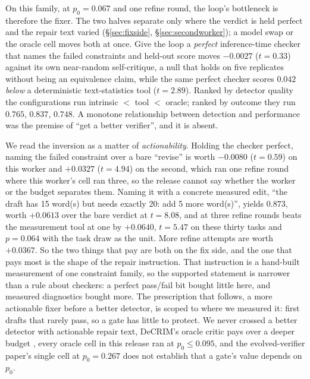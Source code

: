 \documentclass[11pt]{article}
\begin{document}
On this family, at $p_0 = 0.067$ and one refine round, the loop's bottleneck is therefore the
fixer. The two
halves separate only where the verdict is held perfect and the repair text varied
(\S\ref{sec:fixside}, \S\ref{sec:secondworker}); a model swap or the oracle cell moves both at
once. Give the loop a \emph{perfect} inference-time checker that names the failed constraints and
held-out score moves
$-0.0027$ ($t = 0.33$) against its own near-random self-critique, a null that holds on five
replicates without being an equivalence claim, while the same perfect checker scores $0.042$
\emph{below} a deterministic text-statistics tool ($t = 2.89$). Ranked by detector quality the
configurations run intrinsic $<$ tool $<$ oracle; ranked by outcome they run $0.765$, $0.837$,
$0.748$. A monotone relationship between detection and performance was the premise of ``get a
better verifier'', and it is absent.

We read the inversion as a matter of \emph{actionability}. Holding the checker perfect,
naming the failed constraint over a bare ``revise'' is worth $-0.0080$ ($t = 0.59$) on this worker
and $+0.0327$ ($t = 4.94$) on the second, which ran one refine round where this worker's cell
ran three, so the release cannot say whether the worker or the budget separates them. Naming it
with a concrete
measured edit, ``the draft has 15 word(s) but
needs exactly 20: add 5 more word(s)'', yields $0.873$, worth $+0.0613$ over the bare verdict at
$t = 8.08$, and at three refine rounds beats the measurement tool at one by $+0.0640$, $t = 5.47$
on these thirty tasks and $p = 0.064$ with the task draw as the unit. More refine attempts are worth $+0.0367$.
So the two things that pay are both on the fix side, and the one that pays most is the shape of the
repair instruction. That instruction is a hand-built measurement of one constraint family, so the
supported statement is narrower than a rule about checkers: a perfect pass/fail bit bought little
here, and measured diagnostics bought more. The prescription that follows, a more actionable fixer before a better
detector, is scoped to where we measured it: first drafts that rarely pass, so a gate has little to
protect. We never crossed a better detector with actionable repair text, DeCRIM's oracle critic
pays over a deeper budget \citep{ferraz2024decrim}, every oracle cell in this release ran at
$p_0 \le 0.095$, and the evolved-verifier paper's single cell at $p_0 = 0.267$ does not establish
that a gate's value depends on $p_0$.
\end{document}
